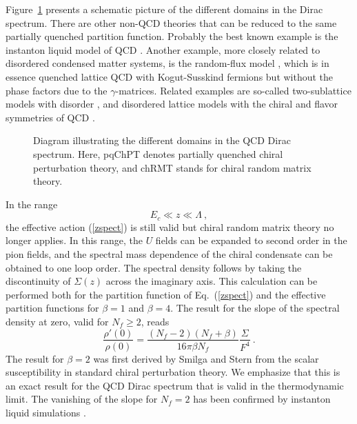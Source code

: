 Figure~\ref{fig:domains} presents a schematic picture of the
different domains in the Dirac spectrum. There are other non-QCD theories that
can be reduced to the same partially quenched partition function.
Probably the best known example is the instanton liquid model of QCD
\cite{instantonl}. Another example, more closely related to
disordered condensed matter systems, is the random-flux model
\cite{simons-altland}, which is in essence quenched lattice QCD with
Kogut-Susskind fermions but without the phase factors due to the
$\gamma$-matrices.  Related examples are so-called two-sublattice
models with disorder \cite{Gade}, and disordered lattice models with the
chiral and flavor symmetries of QCD \cite{Takahashi,Guhr-Wilke-Weidi}.

\begin{figure}[t]
  \begin{center}
    \caption{Diagram illustrating the different domains in the QCD
      Dirac spectrum.  Here,  pqChPT denotes partially quenched chiral
      perturbation theory, and chRMT stands for chiral random matrix
      theory.}  
    \label{fig:domains}
  \end{center}
\end{figure}


In the range
\begin{equation}
  E_c \ll z \ll \Lambda\:,
  \label{dom1}
\end{equation}
the effective action (\ref{zspect}) is still valid but chiral random
matrix theory no longer applies. In this range, the $U$ fields can be
expanded to second order in the pion fields, and the spectral mass
dependence of the chiral condensate can be obtained to one loop order.
The spectral density follows by taking the discontinuity of
$\Sigma(z)$ across the imaginary axis. This calculation can be
performed both for the partition function of Eq.~(\ref{zspect}) and the
effective partition functions for $\beta =1$ and $\beta =4$. The
result for the slope of the spectral density at zero, valid for
$N_f\ge2$, reads \cite{Smilstern,Toub99}
\begin{equation}
  \frac{\rho'(0)}{\rho(0)} =
  \frac {(N_f-2)(N_f+\beta)}
  {16\pi \beta N_f }\frac{\Sigma }{F^4}\:.
\end{equation}
The result for $\beta =2$ was first derived by Smilga and Stern
\cite{Smilstern} from the scalar susceptibility in standard chiral
perturbation theory.  We emphasize that this is an exact result for
the QCD Dirac spectrum that is valid in the thermodynamic limit.  The
vanishing of the slope for $N_f =2$ has been confirmed by instanton
liquid simulations \cite{Acta}.

